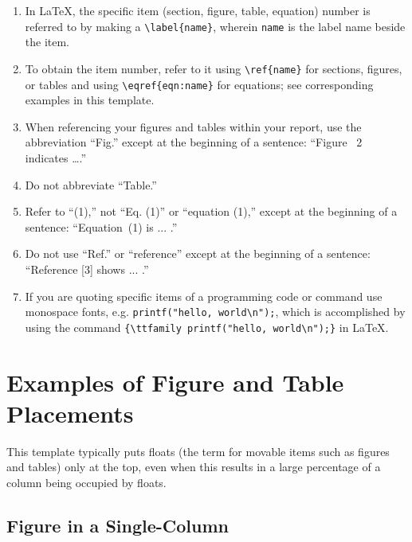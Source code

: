 \begin{enumerate}
	\item In \LaTeX, the specific item (section, figure, table, equation) number is referred to by making a \verb|\label{name}|, wherein \verb|name| is the label name beside the item.

	\item To obtain the item number, refer to it using \verb|\ref{name}| for sections, figures, or tables and using  \verb|\eqref{eqn:name}| for equations; see corresponding examples in this template. 
	
		\item  When referencing your figures and tables within your report, use the abbreviation ``Fig.'' except at the beginning of a sentence: ``Figure~ 2 indicates \ldots .'' 
	
	\item Do not abbreviate ``Table.'' 
	
	\item Refer to ``(1),'' not ``Eq. (1)'' or ``equation (1),'' except at the beginning of a sentence: ``Equation~(1) is ... .''
	
	\item Do not use ``Ref.'' or ``reference'' except at the beginning of a sentence: ``Reference [3] shows ... .'' 
		
	\item If you are quoting specific items of a programming code or command use monospace fonts, e.g. \verb|printf("hello, world\n");|, which is accomplished by using the command \verb|{\ttfamily printf("hello, world\n");}| in \LaTeX. 
	
\end{enumerate}









\section{Examples of Figure and Table Placements}


This template typically puts floats (the term for movable items such as figures and tables) only at the top, even when this results in a large percentage of a column being occupied by floats.



\subsection{Figure in a Single-Column}

